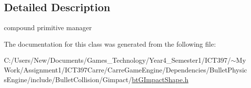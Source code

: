 \subsection{Detailed Description}
compound primitive manager 

The documentation for this class was generated from the following file:\begin{CompactItemize}
\item 
C:/Users/New/Documents/Games\_\-Technology/Year4\_\-Semester1/ICT397/$\sim$My Work/Assignment1/ICT397Carre/CarreGameEngine/Dependencies/BulletPhysicsEngine/include/BulletCollision/Gimpact/\hyperlink{bt_g_impact_shape_8h}{btGImpactShape.h}\end{CompactItemize}
